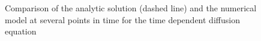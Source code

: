 \documentclass[a4paper]{article}
\begin{document}
\begin{figure}
\caption{Comparison of the analytic solution (dashed line) and the numerical model at several points in time for the time dependent diffusion equation }
\label{fig:1Ddiffusion}
\end{figure}
\end{document}
